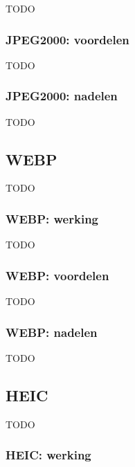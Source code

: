 TODO


\subsubsection{JPEG2000: voordelen}
\label{sec:afbeeldingscompressie-jpeg2000-voordelen}

TODO

\subsubsection{JPEG2000: nadelen}
\label{sec:afbeeldingscompressie-jpeg2000-nadelen}

TODO

\subsection{WEBP}
\label{sec:afbeeldingscompressie-webp}

TODO

\subsubsection{WEBP: werking}
\label{sec:afbeeldingscompressie-webp-werking}

TODO


\subsubsection{WEBP: voordelen}
\label{sec:afbeeldingscompressie-webp-voordelen}

TODO

\subsubsection{WEBP: nadelen}
\label{sec:afbeeldingscompressie-webp-nadelen}

TODO

\subsection{HEIC}
\label{sec:afbeeldingscompressie-heic}

TODO

\subsubsection{HEIC: werking}
\label{sec:afbeeldingscompressie-heic-werking}

